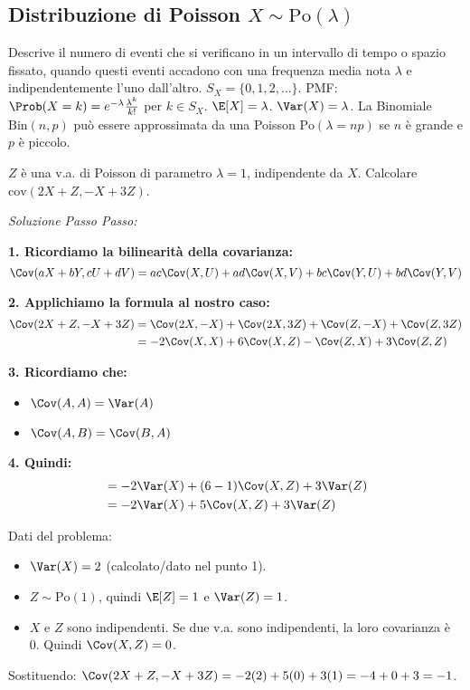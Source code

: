 \subsection{Distribuzione di Poisson \texorpdfstring{$X \sim \text{Po}(\lambda)$}{X ~ Po(lambda)}}
Descrive il numero di eventi che si verificano in un intervallo di tempo o spazio fissato, quando questi eventi accadono con una frequenza media nota $\lambda$ e indipendentemente l'uno dall'altro.
$S_X = \{0, 1, 2, \dots\}$.
PMF: $\Prob(X=k) = e^{-\lambda} \frac{\lambda^k}{k!}$ per $k \in S_X$.
$\E[X] = \lambda$.
$\Var(X) = \lambda$.
La Binomiale $\text{Bin}(n,p)$ può essere approssimata da una Poisson $\text{Po}(\lambda=np)$ se $n$ è grande e $p$ è piccolo.

\begin{example}
$Z$ è una v.a. di Poisson di parametro $\lambda=1$, indipendente da $X$.
Calcolare $\text{cov}(2X+Z, -X+3Z)$.

\textit{Soluzione Passo Passo:}

\textbf{1. Ricordiamo la bilinearità della covarianza:}
\[ \Cov(aX+bY, cU+dV) = ac \Cov(X,U) + ad \Cov(X,V) + bc \Cov(Y,U) + bd \Cov(Y,V) \]

\textbf{2. Applichiamo la formula al nostro caso:}
\begin{align*}
    \Cov(2X+Z, -X+3Z) &= \Cov(2X, -X) + \Cov(2X, 3Z) + \Cov(Z, -X) + \Cov(Z, 3Z) \\
    &= -2 \Cov(X,X) + 6 \Cov(X,Z) - \Cov(Z,X) + 3 \Cov(Z,Z)
\end{align*}

\textbf{3. Ricordiamo che:}
\begin{itemize}
    \item $\Cov(A,A) = \Var(A)$ 
    \item $\Cov(A,B) = \Cov(B,A)$
\end{itemize}

\textbf{4. Quindi:}
\begin{align*}
    &= -2 \Var(X) + (6-1) \Cov(X,Z) + 3 \Var(Z) \\
    &= -2 \Var(X) + 5 \Cov(X,Z) + 3 \Var(Z)
\end{align*}

Dati del problema:
\begin{itemize}
    \item $\Var(X) = 2$ (calcolato/dato nel punto 1).
    \item $Z \sim \text{Po}(1)$, quindi $\E[Z]=1$ e $\Var(Z)=1$.
    \item $X$ e $Z$ sono indipendenti. Se due v.a. sono indipendenti, la loro covarianza è 0. Quindi $\Cov(X,Z)=0$.
\end{itemize}
Sostituendo:
$\Cov(2X+Z, -X+3Z) = -2(2) + 5(0) + 3(1) = -4 + 0 + 3 = -1$.
\end{example}


